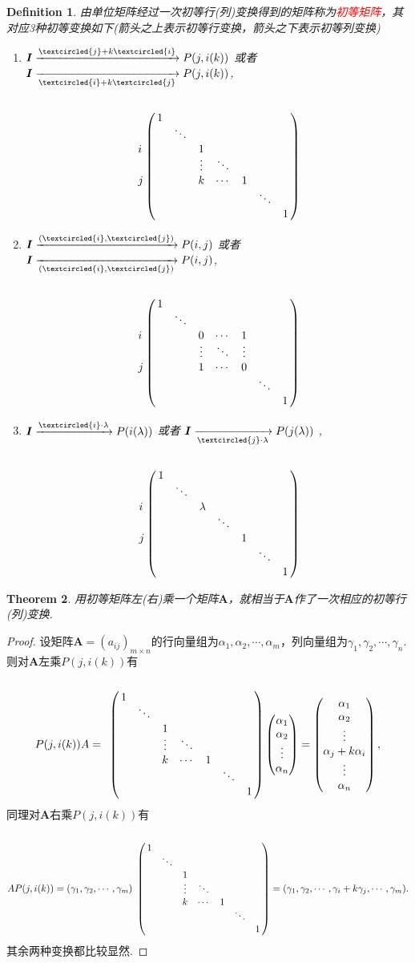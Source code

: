 \documentclass{article}
\newtheorem{theorem}{Theorem}[section]
\newtheorem{definition}[theorem]{Definition}
\newcommand{\mbf}[1]{\bm{#1}}
\newcommand{\redt}[1]{\textcolor{red}{#1}}
\begin{document}
\begin{definition}
\rm 由单位矩阵经过一次初等行(列)变换得到的矩阵称为\redt{初等矩阵}，其对应3种初等变换如下(箭头之上表示初等行变换，箭头之下表示初等列变换)
\begin{enumerate}
	\item $\mbf{I}\xrightarrow{\tiny\textcircled{j} + k\tiny\textcircled{i}} P(j,i(k))$ 或者  $\mbf{I}\xrightarrow[\tiny\textcircled{i} + k\tiny\textcircled{j}]{} P(j,i(k))$,
	$$
		\bordermatrix{
		&\cr
		& 1 \cr
		& &\ddots	\cr
		i& & & 1 \cr
		& & & \vdots & \ddots	\cr
		j& & &  k& \cdots & 1	\cr
		& & & & & & \ddots	\cr
		& & & & & & & 1	\cr
		}
	$$
	\item $\mbf{I}\xrightarrow{(\tiny\textcircled{i},\tiny\textcircled{j})} P(i,j)$ 或者 $\mbf{I}\xrightarrow[(\tiny\textcircled{i},\tiny\textcircled{j})]{} P(i,j)$,
	$$
	\bordermatrix{
		&\cr
		& 1 \cr
		& &\ddots	\cr
		i& & & 0 & \cdots & 1\cr
		& & & \vdots & \ddots & \vdots	\cr
		j& & &  1& \cdots & 0	\cr
		& & & & & & \ddots	\cr
		& & & & & & & 1	\cr
		}
	$$
	\item $\mbf{I}\xrightarrow{\tiny\textcircled{i}\cdot \lambda} P(i(\lambda))$ 或者 $\mbf{I}\xrightarrow[\tiny\textcircled{j}\cdot \lambda]{}P(j(\lambda))$ ,
	$$
	\bordermatrix{
		&\cr
		& 1 \cr
		& &\ddots	\cr
		i& & & \lambda \cr
		& & &  & \ddots	\cr
		j& & &  &  & 1	\cr
		& & & & & & \ddots	\cr
		& & & & & & & 1	\cr
		}
	$$
\end{enumerate}
\end{definition}

\begin{theorem}
\rm 用初等矩阵左(右)乘一个矩阵$\mbf{A}$，就相当于$\mbf{A}$作了一次相应的初等行(列)变换.
\end{theorem}

\begin{proof}
设矩阵$\mbf{A}=(a_{ij})_{m\times n}$的行向量组为$\alpha_1,\alpha_2,\cdots,\alpha_m$，列向量组为$\gamma_1,\gamma_2,\cdots,\gamma_n$. 则对$\mbf{A}$左乘$P(j,i(k))$有
$$
P(j,i(k))A = \bordermatrix{
		&\cr
		& 1 \cr
		& &\ddots	\cr
		& & & 1 \cr
		& & & \vdots & \ddots	\cr
		& & &  k& \cdots & 1	\cr
		& & & & & & \ddots	\cr
		& & & & & & & 1	\cr
		} \begin{pmatrix}\alpha_1 \\ \alpha_2 \\ \vdots \\ \alpha_n \end{pmatrix} = \begin{pmatrix}\alpha_1 \\ \alpha_2 \\ \vdots\\ \alpha_j + k\alpha_i \\ \vdots \\ \alpha_n \end{pmatrix},
$$
同理对$\mbf{A}$右乘$P(j,i(k))$有
$$
AP(j,i(k)) = (\gamma_1,\gamma_2,\cdots,\gamma_m) \bordermatrix{
		&\cr
		& 1 \cr
		& &\ddots	\cr
		& & & 1 \cr
		& & & \vdots & \ddots	\cr
		& & &  k& \cdots & 1	\cr
		& & & & & & \ddots	\cr
		& & & & & & & 1	\cr
		} = (\gamma_1,\gamma_2,\cdots,\gamma_{i} + k\gamma_{j},\cdots,\gamma_m).
$$
其余两种变换都比较显然.
\end{proof}
\end{document}
